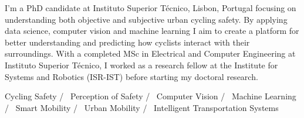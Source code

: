 

\begin{cvparagraph}

I'm a PhD candidate at Instituto Superior Técnico, Lisbon, Portugal focusing on understanding both objective and subjective urban cycling safety. By applying data science, computer vision and machine learning I aim to create a platform for better understanding and predicting how cyclists interact with their surroundings. With a completed MSc in Electrical and Computer Engineering at Instituto Superior Técnico, I worked as a research fellow at the Institute for Systems and Robotics (ISR-IST) before starting my doctoral research.


\end{cvparagraph}
\begin{cvtechnologies}
 Cycling Safety /~
 Perception of Safety /~
 Computer Vision /~
 Machine Learning /~
 Smart Mobility /~
 Urban Mobility /~
 Intelligent Transportation Systems ~
\end{cvtechnologies}
